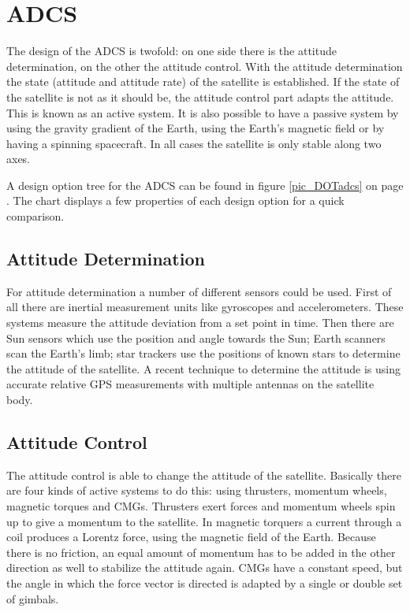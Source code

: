 \section{\acl{ADCS}}
\label{designOptionsADCS}
The design of the \ac{ADCS} is twofold: on one side there is the attitude determination, on the other the attitude control. With the attitude determination the state (attitude and attitude rate) of the satellite is established. If the state of the satellite is not as it should be, the attitude control part adapts the attitude. This is known as an active system. It is also possible to have a passive system by using the gravity gradient of the Earth, using the Earth's magnetic field or by having a spinning spacecraft. In all cases the satellite is only stable along two axes. 

A design option tree for the \ac{ADCS} can be found in figure \ref{pic_DOTadcs} on page \pageref{pic_DOTadcs}. The chart displays a few properties of each design option for a quick comparison.

\subsection{Attitude Determination}
For attitude determination a number of different sensors could be used. First of all there are inertial measurement units like gyroscopes and accelerometers. These systems measure the attitude deviation from a set point in time. Then there are Sun sensors which use the position and angle towards the Sun;  Earth scanners scan the Earth's limb; star trackers use the positions of known stars to determine the attitude of the satellite. A recent technique to determine the attitude is using accurate relative \ac{GPS} measurements with multiple antennas on the satellite body.

\subsection{Attitude Control}
The attitude control is able to change the attitude of the satellite. Basically there are four kinds of active systems to do this: using thrusters, momentum wheels, magnetic torques and \acp{CMG}. Thrusters exert forces and momentum wheels spin up to give a momentum to the satellite. In magnetic torquers a current through a coil produces a Lorentz force, using the magnetic field of the Earth. Because there is no friction, an equal amount of momentum has to be added in the other direction as well to stabilize the attitude again. \ac{CMG}s have a constant speed, but the angle in which the force vector is directed is adapted by a single or double set of gimbals. 

